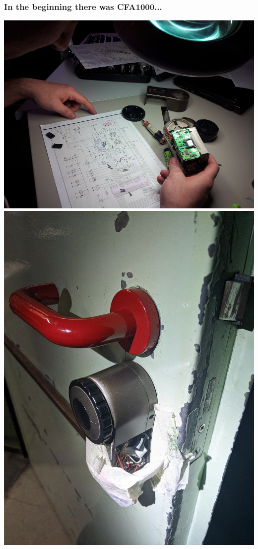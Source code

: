 \documentclass[aspectratio=169]{beamer}
\begin{document}
\begin{frame}
	\frametitle{In the beginning there was CFA1000...}

	\includegraphics[height=0.75\textheight]{CFA1000-1.jpg}
	\includegraphics[height=0.75\textheight]{CFA1000-door.jpg}
\end{frame}
\end{document}
